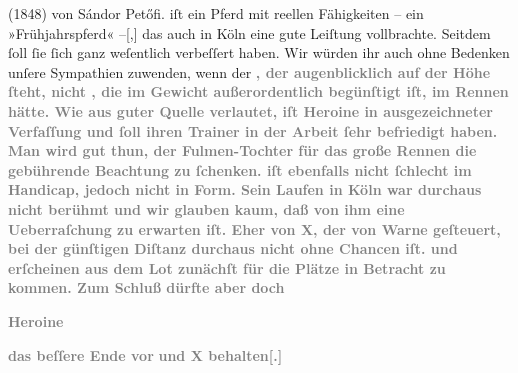 {{{{{                        (1848) von Sándor
                     Petőfi.}}}\label{K_L02914-6} iſt ein Pferd mit reellen Fähigkeiten – ein
                  »Frühjahrspferd« –{[},{]} das auch in Köln eine gute Leiſtung vollbrachte. Seitdem{ }ſoll{ }ſie{ }ſich
                  ganz weſentlich verbeſſert haben. Wir würden ihr auch ohne Bedenken unſere
                  Sympathien zuwenden, wenn der}}{ }\textcolor{gray}{\textbf{}}\textcolor{gray}{\textbf{, der augenblicklich auf der Höhe{ }ſteht, nicht
                     , die im Gewicht außerordentlich begünſtigt
                  iſt, im Rennen hätte. Wie aus guter Quelle verlautet, iſt Heroine in
                  ausgezeichneter Verfaſſung und{ }ſoll ihren Trainer in der Arbeit{ }ſehr befriedigt
                  haben. Man wird gut thun, der Fulmen-Tochter für das große Rennen die gebührende
                  Beachtung zu{ }ſchenken.  iſt ebenfalls nicht{ }ſchlecht im Handicap, jedoch nicht in Form. Sein Laufen in Köln war durchaus nicht berühmt und wir glauben kaum, daß
                  von ihm eine Ueberraſchung zu erwarten iſt. Eher von \textsc{X},
                  der von Warne geſteuert, bei der günſtigen
                  Diſtanz durchaus nicht ohne Chancen iſt.  und  erſcheinen aus dem Lot zunächſt für die Plätze in
                  Betracht zu kommen. Zum Schluß dürfte aber doch}}\pend
           
\pstart
           \centering{}\textcolor{gray}{\textbf{\textbf{Heroine}}}\pend
           
\pstart
           \textcolor{gray}{\textbf{das beſſere Ende vor}}{ }\textcolor{gray}{\textbf{}}\textcolor{gray}{\textbf{{ }und \textsc{X}
                     behalten{[}.{]}}}\pend
           \endnumbering{}  \newcommand{\dateiname}{L02914}\newcommand{\titel}{Paul Goldmann an Arthur Schnitzler, 2. 5. [1900]}\newcommand{\editorInnen}{Martin Anton Müller und Laura Untner}
